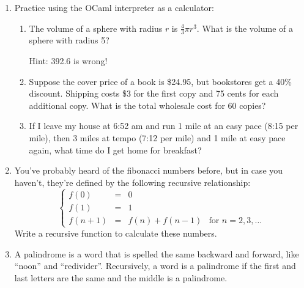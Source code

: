 \documentclass{beamer}
\begin{document}
{{\begin{frame}
\begin{enumerate}
\begin{enumerate}
      \item {}{\hlopt{/}}{}
      
      \item {}{\hlopt{/}}{}
      
      \item {}{\hlopt{+ }}{}{\hlopt{* }}{}
      
      \item {}{\hlopt{* }}{}
    \end{enumerate}
    \item Practice using the OCaml interpreter as a calculator:
    \begin{enumerate}
      \item The volume of a sphere with radius $r$ is $\frac{4}{3} \pi r^3$.
      What is the volume of a sphere with radius 5?
      
      Hint: 392.6 is wrong!
      
      \item Suppose the cover price of a book is \$24.95, but bookstores get a
      40\% discount. Shipping costs \$3 for the first copy and 75 cents for
      each additional copy. What is the total wholesale cost for 60 copies?
      
      \item If I leave my house at 6:52 am and run 1 mile at an easy pace
      (8:15 per mile), then 3 miles at tempo (7:12 per mile) and 1 mile at
      easy pace again, what time do I get home for breakfast?
    \end{enumerate}
    \item You've probably heard of the fibonacci numbers before, but in case
    you haven't, they're defined by the following recursive relationship:
    \[ \left\{\begin{array}{llll}
         f (0) & = & 0 & \\
         f (1) & = & 1 & \\
         f (n + 1) & = & f (n) + f (n - 1) & \text{for } n = 2, 3, \ldots
       \end{array}\right. \]
    Write a recursive function to calculate these numbers.
    
    \item A palindrome is a word that is spelled the same backward and
    forward, like ``noon'' and ``redivider''. Recursively, a word is a
    palindrome if the first and last letters are the same and the middle is a
    palindrome.
    

\end{enumerate}
\end{frame}}}
\end{document}
